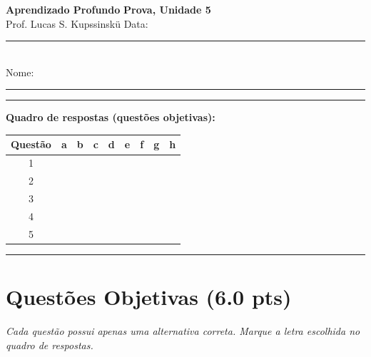 \documentclass[11pt,a4paper]{article}
\begin{document}
{\Large\bfseries Aprendizado Profundo} \hfill \textbf{Prova, Unidade 5}\\
Prof. Lucas S. Kupssinskü \hfill Data: \rule{3cm}{0.4pt}\\[0.4em]
Nome: \rule{12cm}{0.4pt}

\rule{\linewidth}{0.8pt}

\textbf{Quadro de respostas (questões objetivas):}\\[0.3em]
\begin{center}
\begin{tabular}{|c|c|c|c|c|c|c|c|c|}
\hline
\textbf{Questão} & \textbf{a} & \textbf{b} & \textbf{c} & \textbf{d} & \textbf{e} & \textbf{f} & \textbf{g} & \textbf{h} \\\hline
1 & & & & & & & & \\\hline
2 & & & & & & & & \\\hline
3 & & & & & & & & \\\hline
4 & & & & & & & & \\\hline
5 & & & & & & & & \\\hline
\end{tabular}
\end{center}

\rule{\linewidth}{0.4pt}

\section*{Questões Objetivas (6.0 pts)}
\textit{Cada questão possui apenas uma alternativa correta. Marque a letra escolhida no quadro de respostas.}
\end{document}
